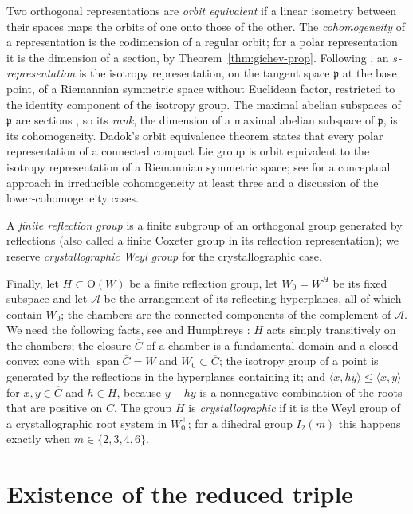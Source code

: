 \documentclass[11pt]{amsart}
\theoremstyle{plain}
\theoremstyle{definition}
\theoremstyle{remark}
\newcommand{\fp}{\mathfrak p}
\newcommand{\ip}[2]{\langle #1,#2\rangle}
\newcommand{\spn}{\operatorname{span}}
\begin{document}
Two orthogonal representations are \emph{orbit equivalent} if a linear isometry between their spaces maps the orbits of one onto those of the other. The \emph{cohomogeneity} of a representation is the codimension of a regular orbit; for a polar representation it is the dimension of a section, by Theorem~\ref{thm:gichev-prop}. Following \cite[Introduction]{EH}, an \emph{$s$-representation} is the isotropy representation, on the tangent space $\fp$ at the base point, of a Riemannian symmetric space without Euclidean factor, restricted to the identity component of the isotropy group. The maximal abelian subspaces of $\fp$ are sections \cite[Section~4]{PT}, so its \emph{rank}, the dimension of a maximal abelian subspace of $\fp$, is its cohomogeneity. Dadok's orbit equivalence theorem \cite[Proposition~6]{Dadok} states that every polar representation of a connected compact Lie group is orbit equivalent to the isotropy representation of a Riemannian symmetric space; see \cite[Introduction and Main Theorem]{EH} for a conceptual approach in irreducible cohomogeneity at least three and a discussion of the lower-cohomogeneity cases.

A \emph{finite reflection group} is a finite subgroup of an orthogonal group generated by reflections (also called a finite Coxeter group in its reflection representation); we reserve \emph{crystallographic Weyl group} for the crystallographic case.

Finally, let $H\subset \mathrm{O}(W)$ be a finite reflection group, let $W_0=W^H$ be its fixed subspace and let $\mathcal A$ be the arrangement of its reflecting hyperplanes, all of which contain $W_0$; the chambers are the connected components of the complement of $\mathcal A$. We need the following facts, see \cite[Ch.~V, \S3, Th.~1, Th.~2 and Prop.~2]{Bourbaki46} and Humphreys \cite[Sections 1.12 and 2.8]{Humphreys}: $H$ acts simply transitively on the chambers; the closure $\overline C$ of a chamber is a fundamental domain and a closed convex cone with $\spn\overline C=W$ and $W_0\subset\overline C$; the isotropy group of a point is generated by the reflections in the hyperplanes containing it; and $\ip{x}{hy}\le\ip{x}{y}$ for $x,y\in\overline C$ and $h\in H$, because $y-hy$ is a nonnegative combination of the roots that are positive on $C$. The group $H$ is \emph{crystallographic} if it is the Weyl group of a crystallographic root system in $W_0^\perp$; for a dihedral group $I_2(m)$ this happens exactly when $m\in\{2,3,4,6\}$.

\section{Existence of the reduced triple}\label{sec:existence}
\end{document}

